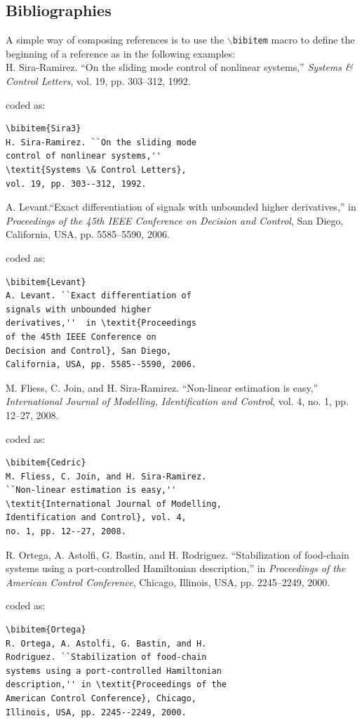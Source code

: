 \documentclass[lettersize,journal]{IEEEtran}
\begin{document}
\subsection{Bibliographies}
 A simple way of composing references is to use the $\backslash${\tt{bibitem}} macro to define the beginning of a reference as in the following examples:\\


\noindent [6] H. Sira-Ramirez. ``On the sliding mode control of nonlinear systems,'' \textit{Systems \& Control Letters}, vol. 19, pp. 303--312, 1992.

\noindent coded as:
\begin{verbatim}
\bibitem{Sira3}
H. Sira-Ramirez. ``On the sliding mode 
control of nonlinear systems,'' 
\textit{Systems \& Control Letters}, 
vol. 19, pp. 303--312, 1992.
\end{verbatim}

\noindent [7] A. Levant.``Exact differentiation of signals with unbounded higher derivatives,''  in \textit{Proceedings of the 45th IEEE Conference on Decision and Control}, San Diego, California, USA, pp. 5585--5590, 2006.

\noindent coded as:
\begin{verbatim}\bibitem{Levant}
A. Levant. ``Exact differentiation of 
signals with unbounded higher 
derivatives,''  in \textit{Proceedings 
of the 45th IEEE Conference on 
Decision and Control}, San Diego, 
California, USA, pp. 5585--5590, 2006.
\end{verbatim}


\noindent [8] M. Fliess, C. Join, and H. Sira-Ramirez. ``Non-linear estimation is easy,'' \textit{International Journal of Modelling, Identification and Control}, vol. 4, no. 1, pp. 12--27, 2008.

\noindent coded as:
\begin{verbatim}
\bibitem{Cedric}
M. Fliess, C. Join, and H. Sira-Ramirez. 
``Non-linear estimation is easy,'' 
\textit{International Journal of Modelling, 
Identification and Control}, vol. 4, 
no. 1, pp. 12--27, 2008.
\end{verbatim}

\noindent [9] R. Ortega, A. Astolfi, G. Bastin, and H. Rodriguez. ``Stabilization of food-chain systems using a port-controlled Hamiltonian description,'' in \textit{Proceedings of the American Control Conference}, Chicago, Illinois, USA, pp. 2245--2249, 2000.

\noindent coded as:
\begin{verbatim}
\bibitem{Ortega}
R. Ortega, A. Astolfi, G. Bastin, and H. 
Rodriguez. ``Stabilization of food-chain 
systems using a port-controlled Hamiltonian 
description,'' in \textit{Proceedings of the 
American Control Conference}, Chicago, 
Illinois, USA, pp. 2245--2249, 2000.
\end{verbatim}
\end{document}
